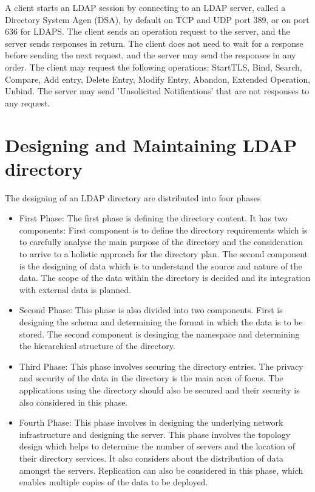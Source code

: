 \documentclass[9pt,twocolumn,twoside]{styles/osajnl}
\begin{document}
A client starts an LDAP session by connecting to an LDAP server,
called a Directory System Agen (DSA), by default on TCP and UDP port
389, or on port 636 for LDAPS. The client sends an operation request
to the server, and the server sends responses in return. The client
does not need to wait for a response before sending the next request,
and the server may send the responses in any order. The client may request
the following operations: StartTLS, Bind, Search, Compare, Add entry,
Delete Entry, Modify Entry, Abandon, Extended Operation, Unbind. The
server may send 'Unsolicited Notifications' that are not responses to any
request.

\section{Designing and Maintaining LDAP directory}
The designing of an LDAP directory are distributed into four phases
\cite{www-ldap-design}
\begin{itemize}
\item First Phase: The first phase is defining the directory
  content. It has two components: First component is to define the
  directory requirements which is to carefully analyse the main
  purpose of the directory and the consideration to arrive to a
  holistic approach for the directory plan.  The second component is
  the designing of data which is to understand the source and nature
  of the data. The scope of the data within the directory is decided
  and its integration with external data is
  planned. \cite{www-ldap-design}

\item Second Phase: This phase is also divided into two
  components. First is designing the schema and determining the format
  in which the data is to be stored. The second component is desinging
  the namespace and determining the hierarchical structure of the
  directory.

\item Third Phase: This phase involves securing the directory
  entries. The privacy and security of the data in the directory is
  the main area of focus.  The applications using the directory should
  also be secured and their security is also considered in this phase.

\item Fourth Phase: This phase involves in designing the underlying
  network infrastructure and designing the server. This phase involves
  the topology design which helps to determine the number of servers
  and the location of their directory services. It also considers
  about the distribution of data amongst the servers. Replication can
  also be considered in this phase, which enables multiple copies of
  the data to be deployed. \cite{www-ldap-design}
  
\end{itemize}
\end{document}
